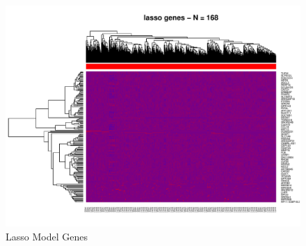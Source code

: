 \documentclass[
]{book}
\begin{document}
\begin{figure}
\centering
\includegraphics{Static/figures/brcaRna-glmnetFit-heatmapLasso-1.pdf}
\caption{\label{fig:brcaRna-glmnetFit-heatmapLasso}Lasso Model Genes}
\end{figure}
\end{document}
